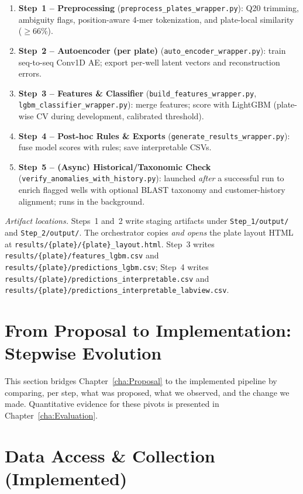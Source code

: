 \begin{enumerate}
  \item \textbf{Step~1 -- Preprocessing} (\texttt{preprocess\_plates\_wrapper.py}): Q20 trimming, ambiguity flags, position-aware 4-mer tokenization, and plate-local similarity ($\geq$66\%).
  \item \textbf{Step~2 -- Autoencoder (per plate)} (\texttt{auto\_encoder\_wrapper.py}): train seq-to-seq Conv1D AE; export per-well latent vectors and reconstruction errors.
  \item \textbf{Step~3 -- Features \& Classifier} (\texttt{build\_features\_wrapper.py}, \texttt{lgbm\_classifier\_wrapper.py}): merge features; score with LightGBM (plate-wise CV during development, calibrated threshold).
  \item \textbf{Step~4 -- Post-hoc Rules \& Exports} (\texttt{generate\_results\_wrapper.py}): fuse model scores with rules; save interpretable CSVs.
  \item \textbf{Step~5 -- (Async) Historical/Taxonomic Check} (\texttt{verify\_anomalies\_with\_history.py}): launched \emph{after} a successful run to enrich flagged wells with optional BLAST taxonomy and customer-history alignment; runs in the background.
\end{enumerate}

\noindent\textit{Artifact locations.} Steps~1 and~2 write staging artifacts under \texttt{Step\_1/output/} and \texttt{Step\_2/output/}. The orchestrator copies \emph{and opens} the plate layout HTML at \texttt{results/\{plate\}/\{plate\}\_layout.html}. Step~3 writes \texttt{results/\{plate\}/features\_lgbm.csv} and \texttt{results/\{plate\}/predictions\_lgbm.csv}; Step~4 writes \texttt{results/\{plate\}/predictions\_interpretable.csv} and \texttt{results/\{plate\}/predictions\_interpretable\_labview.csv}.

\section{From Proposal to Implementation: Stepwise Evolution}
\label{sec:stepwise_evolution}

This section bridges Chapter~\ref{cha:Proposal} to the implemented pipeline by comparing, per step, what was proposed, what we observed, and the change we made. Quantitative evidence for these pivots is presented in Chapter~\ref{cha:Evaluation}.

\section{Data Access \& Collection (Implemented)}
\label{sec:impl_backend_access}

